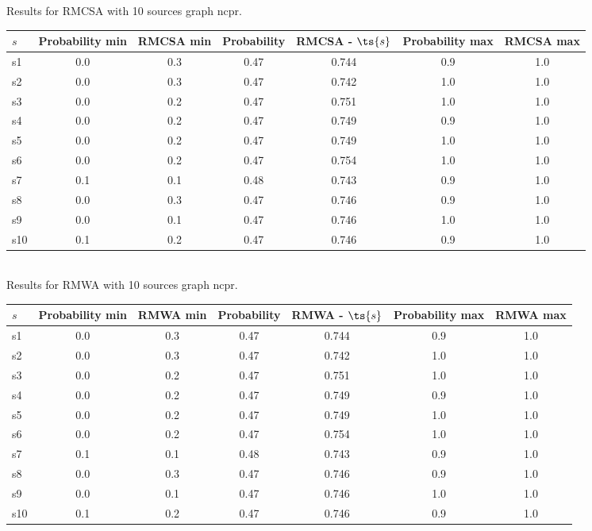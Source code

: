 \documentclass{article}
\begin{document}
\noindent Results for RMCSA with 10 sources graph ncpr.

\noindent\begin{tabular}{|l|c|c|c|c|c|c|}
\hline
$s$& Probability min & RMCSA min & Probability & RMCSA - $\ts{s}$ & Probability max & RMCSA max\\
\hline
s1 &0.0 & 0.3 & 0.47 & 0.744 & 0.9 & 1.0\\
\hline
s2 &0.0 & 0.3 & 0.47 & 0.742 & 1.0 & 1.0\\
\hline
s3 &0.0 & 0.2 & 0.47 & 0.751 & 1.0 & 1.0\\
\hline
s4 &0.0 & 0.2 & 0.47 & 0.749 & 0.9 & 1.0\\
\hline
s5 &0.0 & 0.2 & 0.47 & 0.749 & 1.0 & 1.0\\
\hline
s6 &0.0 & 0.2 & 0.47 & 0.754 & 1.0 & 1.0\\
\hline
s7 &0.1 & 0.1 & 0.48 & 0.743 & 0.9 & 1.0\\
\hline
s8 &0.0 & 0.3 & 0.47 & 0.746 & 0.9 & 1.0\\
\hline
s9 &0.0 & 0.1 & 0.47 & 0.746 & 1.0 & 1.0\\
\hline
s10 &0.1 & 0.2 & 0.47 & 0.746 & 0.9 & 1.0\\
\hline
\end{tabular}\\

\noindent Results for RMWA with 10 sources graph ncpr.

\noindent\begin{tabular}{|l|c|c|c|c|c|c|}
\hline
$s$& Probability min & RMWA min & Probability & RMWA - $\ts{s}$ & Probability max & RMWA max\\
\hline
s1 &0.0 & 0.3 & 0.47 & 0.744 & 0.9 & 1.0\\
\hline
s2 &0.0 & 0.3 & 0.47 & 0.742 & 1.0 & 1.0\\
\hline
s3 &0.0 & 0.2 & 0.47 & 0.751 & 1.0 & 1.0\\
\hline
s4 &0.0 & 0.2 & 0.47 & 0.749 & 0.9 & 1.0\\
\hline
s5 &0.0 & 0.2 & 0.47 & 0.749 & 1.0 & 1.0\\
\hline
s6 &0.0 & 0.2 & 0.47 & 0.754 & 1.0 & 1.0\\
\hline
s7 &0.1 & 0.1 & 0.48 & 0.743 & 0.9 & 1.0\\
\hline
s8 &0.0 & 0.3 & 0.47 & 0.746 & 0.9 & 1.0\\
\hline
s9 &0.0 & 0.1 & 0.47 & 0.746 & 1.0 & 1.0\\
\hline
s10 &0.1 & 0.2 & 0.47 & 0.746 & 0.9 & 1.0\\
\hline
\end{tabular}\\
\end{document}
